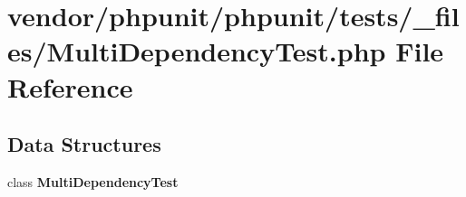 \section{vendor/phpunit/phpunit/tests/\+\_\+files/\+Multi\+Dependency\+Test.php File Reference}
\label{_multi_dependency_test_8php}
\subsection*{Data Structures}
\begin{DoxyCompactItemize}
\item 
class {\bf Multi\+Dependency\+Test}
\end{DoxyCompactItemize}
